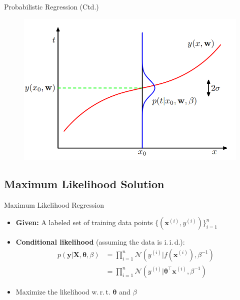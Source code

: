\begin{frame}{Probabilistic Regression (Ctd.)}{}
	\begin{figure}
		\includegraphics[scale=0.35]{05_regression/02_img/probabilistic_regression}
	\end{figure}
\end{frame}


\subsection{Maximum Likelihood Solution}

\begin{frame}{Maximum Likelihood Regression}{}
	\begin{itemize}
		\item \textbf{Given:} A labeled set of training data points $\{ (\bm{x}^{(i)}, y^{(i)}) \}_{i=1}^n$
		\item \textbf{Conditional likelihood} (assuming the data is i.\,i.\,d.):
		\begin{align}
			p(\bm{y} \vert \bm{X}, \bm{\theta}, \beta)
				&= \prod_{i=1}^n \mathcal{N}(y^{(i)} \vert f(\bm{x}^{(i)}), \beta^{-1}) \\
				&= \prod_{i=1}^n \mathcal{N}(y^{(i)} \vert \bm{\theta}^{\intercal}\bm{x}^{(i)}, \beta^{-1})
		\end{align}
		\item Maximize the likelihood w.\,r.\,t. $\bm{\theta}$ and $\beta$
	\end{itemize}
\end{frame}


